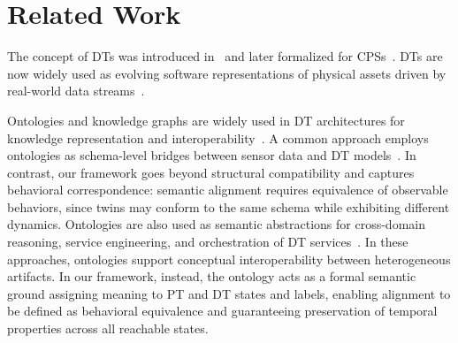 \section{Related Work}


The concept of DTs was introduced in~\cite{grieves2005} and later formalized for CPSs~\cite{glaessgen2012}. DTs are now widely used as evolving software representations of physical assets driven by real-world data streams~\cite{botin2022digital,mihai2022digital,10.1145/3735948.3736156}.


Ontologies and knowledge graphs are widely used in DT architectures for knowledge representation and interoperability~\cite{KARABULUT2024442}. A common approach employs ontologies as schema-level bridges between sensor data and DT models~\cite{10.1016/j.rcim.2023.102649,steinmetz2022methodology}. In contrast, our framework goes beyond structural compatibility and captures behavioral correspondence: semantic alignment requires equivalence of observable behaviors, since twins may conform to the same schema while exhibiting different dynamics. Ontologies are also used as semantic abstractions for cross-domain reasoning, service engineering, and orchestration of DT services~\cite{Boje2024DTSemantics,elhajj2026semantic,10.1145/3652620.3688261,GrangelGonzalez2016,Bader2019SemanticAAS,Arm2021AAS,farias2024dtag}. In these approaches, ontologies support conceptual interoperability between heterogeneous artifacts. In our framework, instead, the ontology acts as a formal semantic ground assigning meaning to PT and DT states and labels, enabling alignment to be defined as behavioral equivalence and guaranteeing preservation of temporal properties across all reachable states.




